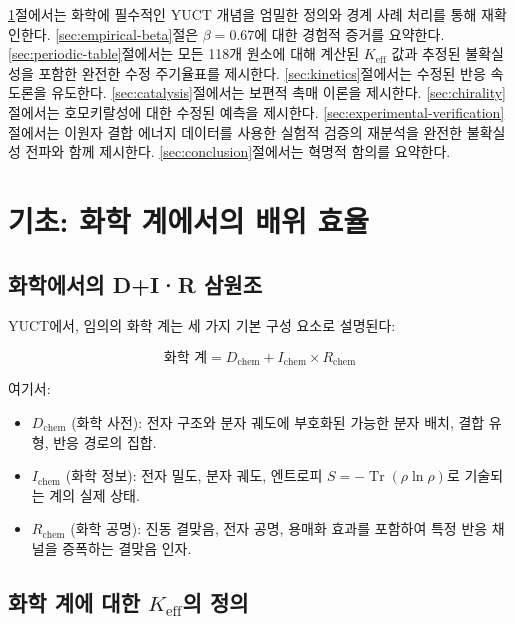 \documentclass[12pt,a4paper]{article}
\newcommand{\Keff}{K_{\mathrm{eff}}}
\DeclareMathOperator{\Tr}{Tr}
\begin{document}
	\ref{sec:foundations}절에서는 화학에 필수적인 YUCT 개념을 엄밀한 정의와 경계 사례 처리를 통해 재확인한다. \ref{sec:empirical-beta}절은 $\beta = 0.67$에 대한 경험적 증거를 요약한다. \ref{sec:periodic-table}절에서는 모든 118개 원소에 대해 계산된 $\Keff$ 값과 추정된 불확실성을 포함한 완전한 수정 주기율표를 제시한다. \ref{sec:kinetics}절에서는 수정된 반응 속도론을 유도한다. \ref{sec:catalysis}절에서는 보편적 촉매 이론을 제시한다. \ref{sec:chirality}절에서는 호모키랄성에 대한 수정된 예측을 제시한다. \ref{sec:experimental-verification}절에서는 이원자 결합 에너지 데이터를 사용한 실험적 검증의 재분석을 완전한 불확실성 전파와 함께 제시한다. \ref{sec:conclusion}절에서는 혁명적 함의를 요약한다.
	
	\section{기초: 화학 계에서의 배위 효율}
	\label{sec:foundations}
	
	\subsection{화학에서의 D+I·R 삼원조}
	
	YUCT에서, 임의의 화학 계는 세 가지 기본 구성 요소로 설명된다:
	
	\begin{equation}
		\text{화학 계} = D_{\text{chem}} + I_{\text{chem}} \times R_{\text{chem}}
		\label{eq:chem-triad}
	\end{equation}
	
	여기서:
	\begin{itemize}
		\item $D_{\text{chem}}$ (화학 사전): 전자 구조와 분자 궤도에 부호화된 가능한 분자 배치, 결합 유형, 반응 경로의 집합.
		\item $I_{\text{chem}}$ (화학 정보): 전자 밀도, 분자 궤도, 엔트로피 $S = -\Tr(\rho \ln \rho)$로 기술되는 계의 실제 상태.
		\item $R_{\text{chem}}$ (화학 공명): 진동 결맞음, 전자 공명, 용매화 효과를 포함하여 특정 반응 채널을 증폭하는 결맞음 인자.
	\end{itemize}
	
	\subsection{화학 계에 대한 $\Keff$의 정의}
	
\end{document}
